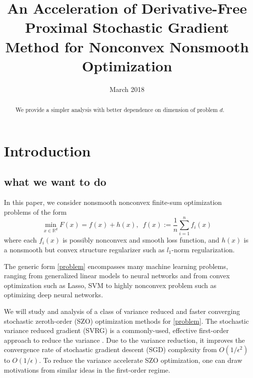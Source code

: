 \documentclass{article}
\title{An Acceleration of Derivative-Free Proximal Stochastic Gradient Method for Nonconvex Nonsmooth Optimization}
\date{March 2018}
\newcommand*{\R}{\mathbb{R}}
\theoremstyle{definition}
\theoremstyle{remark}
\begin{document}
\maketitle
\begin{abstract}
We provide a simpler analysis with better dependence on dimension of problem $d$. 
\end{abstract}

\section{Introduction}
\subsection{what we want to do}
{\color{Green}\label{problem}
{\color{Violet}
In this paper, we consider nonsmooth nonconvex finite-sum optimization problems of the form
}
\begin{equation}
\min_{x\in\R^d} F(x) =  f(x) + h(x),\,\,\,f(x):=\frac{1}{n}\sum_{i=1}^n f_i(x)
\end{equation}
where each $f_i(x)$ is {\color{Violet} possibly} nonconvex and smooth loss function, and $h(x)$ is a nonsmooth but convex structure regularizer such as $l_1$-norm regularization. }
{\color{Brown}
The generic form \eqref{problem} encompasses
many machine learning problems, ranging from generalized linear models to neural networks 
{\color{Violet} and from convex optimization such as Lasso, SVM to highly nonconvex problem such as optimizing deep neural networks.}


We will study and analysis of {\color{Green} a class of} variance reduced and faster converging stochastic zeroth-order (SZO) optimization methods for \eqref{problem}. The stochastic variance reduced gradient
(SVRG) is a commonly-used, effective first-order approach to reduce the variance \cite{johnson2013accelerating,reddi2016stochastic,nitanda2016accelerated,allen2016improved,lei2017non}. Due to
the variance
reduction, it improves the convergence rate of stochastic gradient descent (SGD) complexity from
$O(1/\epsilon^2)$ to $O(1/{\epsilon})$. To reduce the variance accelerate SZO optimization, one can draw
motivations from similar ideas in the first-order regime. 


}
\end{document}
